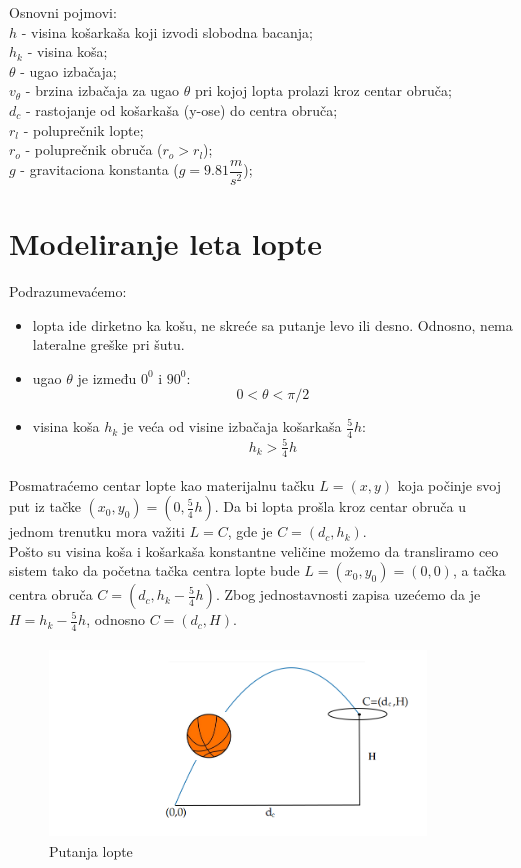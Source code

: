 \documentclass[a4paper, 12pt]{article}
\begin{document}
Osnovni pojmovi:\\
$h$ - visina košarkaša koji izvodi slobodna bacanja;\\
$h_k$ - visina koša;\\
$\theta$ - ugao izbačaja;\\
$v_\theta$ - brzina izbačaja za ugao $\theta$ pri kojoj lopta prolazi kroz centar obruča;\\
$d_c$ - rastojanje od košarkaša (y-ose) do centra obruča;\\
$r_l$ - poluprečnik lopte;\\
$r_o$ - poluprečnik obruča ($r_o>r_l$);\\
$g$ - gravitaciona konstanta ($g = 9.81 \dfrac{m}{s^2}$);\\



\section{Modeliranje leta lopte}

Podrazumevaćemo:
\begin{itemize}

\item lopta ide dirketno ka košu, ne skreće sa putanje levo ili desno. Odnosno, nema lateralne greške pri šutu.

\item ugao $\theta$ je između $0^0$ i $90^0$:\\
\[0 < \theta < \pi/2\]

\item visina koša $h_k$ je veća od visine izbačaja košarkaša $\dfrac{_5}{^4}h$:\\
\[h_k > \dfrac{_5}{^4}h\]

\end{itemize}


Posmatraćemo centar lopte kao materijalnu tačku $L = (x,y)$ koja počinje svoj put iz tačke $(x_0,y_0) = (0,\dfrac{_5}{^4}h)$. Da bi lopta prošla kroz centar obruča u jednom trenutku mora važiti $L = C$, gde je $C = (d_c,h_k)$.\\

Pošto su visina koša i košarkaša konstantne veličine možemo da transliramo ceo sistem tako da početna tačka centra lopte bude $L = (x_0,y_0) = (0,0)$, a tačka centra obruča $C = (d_c,h_k-\dfrac{_5}{^4}h)$.
Zbog jednostavnosti zapisa uzećemo da je $H = h_k-\dfrac{_5}{^4}h$, odnosno $C = (d_c,H)$.\\

\begin{figure}[h]
\hspace*{0.9cm}
\includegraphics[width=10cm, height=5cm]{pic1}
\caption{Putanja lopte}
\end{figure}
\end{document}

